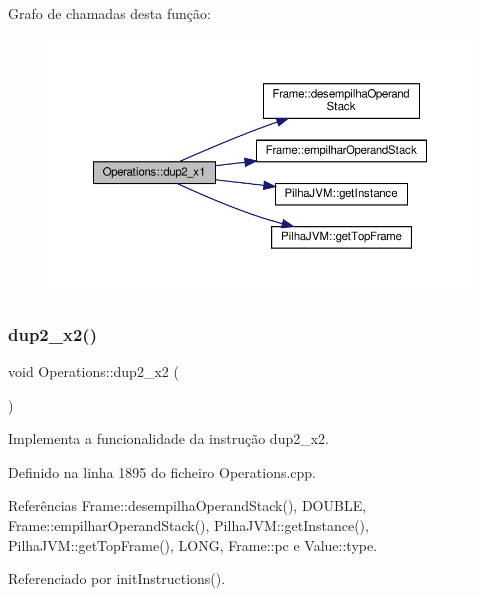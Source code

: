 Grafo de chamadas desta função\+:\nopagebreak
\begin{figure}[H]
\begin{center}
\leavevmode
\includegraphics[width=350pt]{classOperations_a57b0cf4d7a133bf35b39fcf8d6e15511_cgraph}
\end{center}
\end{figure}
\mbox{\label{classOperations_ab49247b3958376b27e8347e053dfe7de}} 
\subsubsection{\texorpdfstring{dup2\+\_\+x2()}{dup2\_x2()}}
{\footnotesize\ttfamily void Operations\+::dup2\+\_\+x2 (\begin{DoxyParamCaption}{ }\end{DoxyParamCaption})\hspace{0.3cm}{\ttfamily [private]}}



Implementa a funcionalidade da instrução dup2\+\_\+x2. 



Definido na linha 1895 do ficheiro Operations.\+cpp.



Referências Frame\+::desempilha\+Operand\+Stack(), D\+O\+U\+B\+LE, Frame\+::empilhar\+Operand\+Stack(), Pilha\+J\+V\+M\+::get\+Instance(), Pilha\+J\+V\+M\+::get\+Top\+Frame(), L\+O\+NG, Frame\+::pc e Value\+::type.



Referenciado por init\+Instructions().

